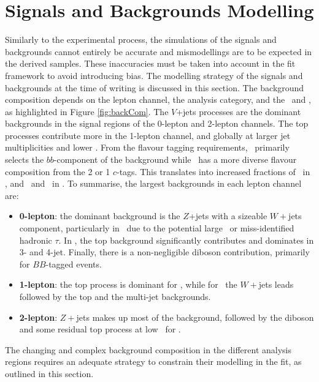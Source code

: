 \section{Signals and Backgrounds Modelling}\label{sec-mod}
Similarly to the experimental process, the simulations of the signals and backgrounds cannot entirely be accurate and mismodellings are to be expected in the derived samples. These inaccuracies must be taken into account in the fit framework to avoid introducing bias. The modelling strategy of the signals and backgrounds at the time of writing is discussed in this section. The background composition depends on the lepton channel, the analysis category, and the \ptv\ and \nj, as highlighted in Figure \ref{fig:backCom}. The $V$+jets processes are the dominant backgrounds in the signal regions of the 0-lepton and 2-lepton channels. The top processes contribute more in the 1-lepton channel, and globally at larger jet multiplicities and lower \ptv. From the flavour tagging requirements, \vhb\ primarily selects the $bb$-component of the background while \vhc\ has a more diverse flavour composition from the 2 or 1 $c$-tags. This translates into increased fractions of \vhf\ in \vhb, and \vmf\ and \vlf\ in \vhc. To summarise, the largest backgrounds in each lepton channel are:
\begin{itemize}[leftmargin=*]
    \item \textbf{0-lepton}: the dominant background is the $Z$+jets with a sizeable $W+$jets component, particularly in \vhc\ due to the potential large \etm\ or miss-identified hadronic $\tau$. In \vhb, the top background significantly contributes and dominates in 3- and 4-jet. Finally, there is a non-negligible diboson contribution, primarily for $BB$-tagged events.
    \item \textbf{1-lepton}: the top process is dominant for \vhb, while for \vhc\ the $W+$jets leads followed by the top and the multi-jet backgrounds.  
    \item \textbf{2-lepton}: $Z+$jets makes up most of the background, followed by the diboson and some residual top process at low \ptv\ for \vhb. 
\end{itemize}
The changing and complex background composition in the different analysis regions requires an adequate strategy to constrain their modelling in the fit, as outlined in this section.

